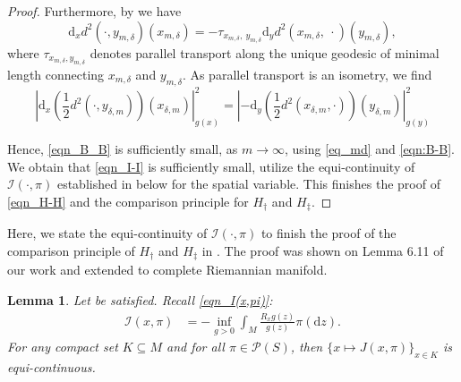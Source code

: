 \documentclass[a4paper]{article}
\numberwithin{equation}{section}
\newtheorem{lemma}[theorem]{Lemma}
\theoremstyle{definition}
\begin{document}
\begin{proof}
Furthermore, by  we have
\begin{equation}\label{eqn_staud}
 \mathrm{d}_xd^2(\cdot,y_{m,\delta})(x_{m,\delta})=  -\tau_{x_{m,\delta},~y_{m,\delta}} \mathrm{d}_yd^2(x_{m,\delta},~\cdot)(y_{m,\delta}),
\end{equation}
where $\tau_{x_{m,\delta},y_{m,\delta}}$ denotes parallel transport along the unique geodesic of minimal length connecting $x_{m,\delta}$ and $y_{m,\delta}$. As parallel transport is an isometry, we find
\begin{equation*}
\left|\mathrm{d}_{x}\left(\frac{1}{2} d^2(\cdot,y_{\delta,m})\right)(x_{\delta,m}) \right|_{g(x)}^2=\left|- \mathrm{d}_y \left(\frac{1}{2}d^2(x_{\delta,m},\cdot)\right)(y_{\delta,m}) \right|^2_{g(y)}
\end{equation*}
\par
Hence, \eqref{eqn_B_B} is sufficiently small, as $m\to \infty$,  using \eqref{eq_md}  and \eqref{eqn:B-B}. 
We obtain that \eqref{eqn_I-I} is sufficiently small, utilize the equi-continuity of $\mathcal{I}(\cdot,\pi)$ established in  below for the spatial variable. This finishes the proof of \eqref{eqn_H-H} and the comparison principle for $H_\dagger$ and $H_\ddagger$.
 \end{proof}

Here, we state the equi-continuity of $\mathcal{I}(\cdot,\pi)$ to finish the proof of the comparison principle of $H_\dagger$ and $H_\ddagger$ in . The proof was shown on Lemma 6.11 of our work \cite{HKX2023} and extended to complete Riemannian manifold.
\begin{lemma}\label{lem_Lip}
Let  be satisfied. Recall \eqref{eqn_I(x,pi)}:
\begin{align*}
\mathcal{I}(x,\pi)&=-\inf_{g>0}\int_{M}\frac{R_{x}g(z)}{g(z)}\pi(\mathrm{d}z).
\end{align*}
For any compact set $K\subseteq M$ and for all $\pi\in \mathcal{P}(S)$, then $\{x\mapsto J(x,\pi)\}_{x\in K}$ is equi-continuous.
\end{lemma}
\end{document}
